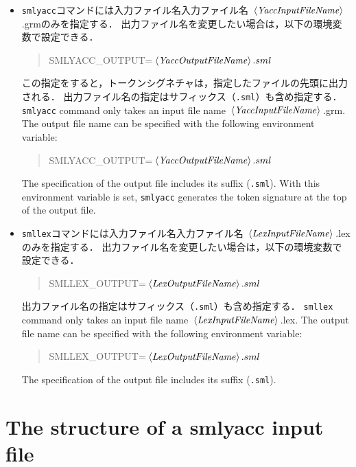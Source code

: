 \documentclass{jbook}
\newcommand{\txt}[2]{#2}
\newcommand{\code}[1]{\mbox{\large\tt #1}}
\newcommand{\nonterm}[1]{\mbox{$\,\langle$}{\it #1}\mbox{$\rangle\,$}}
\newenvironment{program}{\begin{quote}\begin{tt}}%
                        {\end{tt}\end{quote}}
\begin{document}
\begin{itemize}
\item 
\ifjp%
	\code{smlyacc}コマンドには入力ファイル名入力ファイル名
$\nonterm{YaccInputFileName}$.grmのみを指定する．
	出力ファイル名を変更したい場合は，以下の環境変数で設定できる．
\begin{program}
SMLYACC\_OUTPUT=$\nonterm{YaccOutputFileName}.sml$
\end{program}	
この指定をすると，トークンシグネチャは，指定したファイルの先頭に出力される．
	出力ファイル名の指定はサフィックス（\code{.sml}）も含め指定する．
\else%
	\code{smlyacc} command only takes an input file name $\nonterm{YaccInputFileName}$.grm.
	The output file name can be specified with the following
environment variable:
\begin{program}
SMLYACC\_OUTPUT=$\nonterm{YaccOutputFileName}.sml$
\end{program}	
	The specification of the output file includes its suffix (\code{.sml}).
	With this environment variable is set, \code{smlyacc} generates
the token signature at the top of the output file.
\fi%

\item 
\ifjp%
	\code{smllex}コマンドには入力ファイル名入力ファイル名
$\nonterm{LexInputFileName}$.lexのみを指定する．
	出力ファイル名を変更したい場合は，以下の環境変数で設定できる．
\begin{program}
SMLLEX\_OUTPUT=$\nonterm{LexOutputFileName}.sml$
\end{program}	
	出力ファイル名の指定はサフィックス（\code{.sml}）も含め指定する．
\else%
	\code{smllex} command only takes an input file name $\nonterm{LexInputFileName}$.lex.
	The output file name can be specified with the following
environment variable:
\begin{program}
SMLLEX\_OUTPUT=$\nonterm{LexOutputFileName}.sml$
\end{program}	
	The specification of the output file includes its suffix (\code{.sml}).
\fi%
\end{itemize}

\section{\txt{smlyacc入力ファイルの構造}{The structure of a smlyacc input file}}
\end{document}
